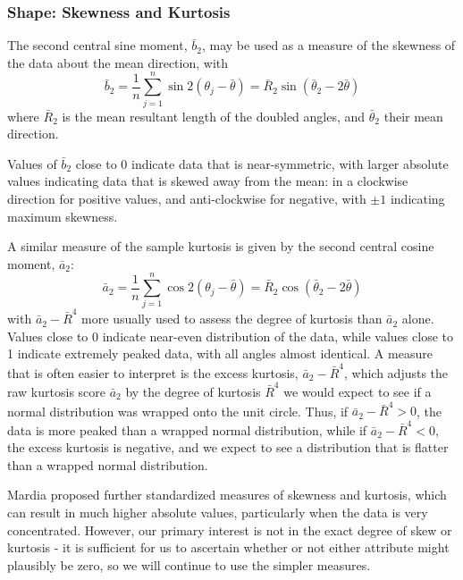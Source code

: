 \documentclass[../../ArchStats.tex]{subfiles}
\begin{document}


\subsubsection{Shape: Skewness and Kurtosis}
\label{sec:shape}

The second central sine moment, $\bar{b}_2$, may be used as a measure of the skewness of the data about the mean direction, with
	\begin{equation}
	\label{eqn:bar-b-2}
	\bar{b}_2 = \frac{1}{n} \sum_{j=1}^n \sin 2(\theta_j-\bar{\theta}) = \bar{R}_2 \sin(\bar{\theta}_2 - 2\bar{\theta})
	\end{equation}
where $\bar{R}_2$ is the mean resultant length of the doubled angles, and $\bar{\theta}_2$ their mean direction. 

Values of $\bar{b}_2$ close to 0 indicate data that is near-symmetric, with larger  absolute values indicating data that is skewed away from the mean: in a clockwise direction for positive values, and anti-clockwise for negative, with $\pm1$ indicating maximum skewness.

A similar measure of the sample kurtosis is given by the second central cosine moment, $\bar{a}_2$:
	\begin{equation}
 	\bar{a}_2 = \frac{1}{n} \sum_{j=1}^n \cos 2(\theta_j-\bar{\theta}) = \bar{R}_2 \cos(\bar{\theta}_2 - 2\bar{\theta}) 
 	\end{equation}
 with $\bar{a}_2 - \bar{R}^4$ more usually used to assess the degree of kurtosis than $\bar{a}_2$ alone. 
Values close to 0 indicate near-even distribution of the data, while values close to 1 indicate extremely peaked data, with all angles almost identical. A measure that is often easier to interpret is the excess kurtosis, $\bar{a}_2 - \bar{R}^4$, which adjusts the raw kurtosis score $\bar{a}_2$ by the degree of kurtosis $\bar{R}^4$ we would expect to see if a normal distribution was wrapped onto the unit circle. Thus, if $\bar{a}_2 - \bar{R}^4 > 0$, the data is more peaked than a wrapped normal distribution, while if $\bar{a}_2 - \bar{R}^4 < 0$, the excess kurtosis is negative, and we expect to see a distribution that is flatter than a wrapped normal distribution.

Mardia \cite{Mardia1972} proposed further standardized measures of skewness and kurtosis, which can result in much higher absolute values, particularly when the data is very concentrated. However, our primary interest is not in the exact degree of skew or kurtosis - it is sufficient for us to ascertain whether or not either attribute might plausibly be zero, so we will continue to use the simpler measures.
\end{document}
